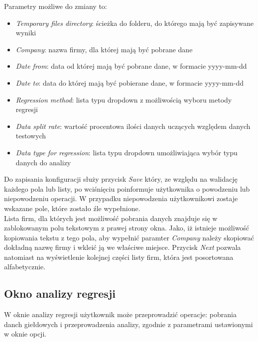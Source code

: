 Parametry możliwe do zmiany to:
\begin{itemize}
 \item \textit{Temporary files directory}: ścieżka do folderu, do którego mają być zapisywane wyniki
 \item \textit{Company}: nazwa firmy, dla której mają być pobrane dane
 \item \textit{Date from}: data od której mają być pobrane dane, w formacie yyyy-mm-dd
 \item \textit{Date to}: data do której mają być pobierane dane, w formacie yyyy-mm-dd
 \item \textit{Regression method}: lista typu dropdown z możliwością wyboru metody regresji
 \item \textit{Data split rate}: wartość procentowa ilości danych uczących względem danych testowych
 \item \textit{Data type for regression}: lista typu dropdown umożliwiająca wybór typu danych do analizy
\end{itemize}

Do zapisania konfiguracji służy przycisk \textit{Save} który, ze względu na walidację każdego pola lub listy, po wciśnięciu poinformuje użytkownika o powodzeniu lub niepowodzeniu operacji.
W przypadku niepowodzenia użytkownikowi zostaje wskazane pole, które zostało źle wypełnione.\\

Lista firm, dla których jest możliwość pobrania danych znajduje się w zablokowanym polu tekstowym z prawej strony okna.
Jako, iż istnieje możliwość kopiowania tekstu z tego pola, aby wypełnić paramter \textit{Company} należy skopiować dokładną nazwę firmy i wkleić ją we właściwe miejsce.
Przycisk \textit{Next} pozwala natomiast na wyświetlenie kolejnej części listy firm, która jest posortowana alfabetycznie.

\subsection{Okno analizy regresji}
W oknie analizy regresji użytkownik może przeprowadzić operacje: pobrania danch giełdowych i przeprowadzenia analizy, zgodnie z parametrami ustawionymi w oknie opcji.

